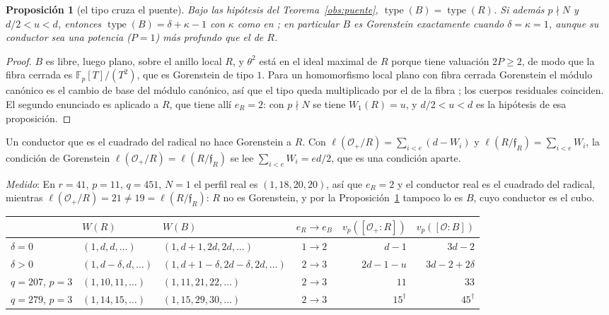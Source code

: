\documentclass[11pt,a4paper]{article}
\newtheorem{proposition}[theorem]{Proposici\'on}
\theoremstyle{definition}
\newcommand{\FF}{\mathbb{F}}
\newcommand{\cO}{\mathcal{O}}
\newcommand{\medido}[1]{\emph{Medido}: #1}
\begin{document}
\begin{proposition}[el tipo cruza el puente]\label{prop:tipopuente}
Bajo las hip\'otesis del Teorema~\ref{obs:puente},
$\operatorname{type}(B)=\operatorname{type}(R)$. Si adem\'as $p\nmid N$ y $d/2<u<d$, entonces
$\operatorname{type}(B)=\delta+\kappa-1$ con $\kappa$ como en \cite[Prop.~11]{Cond}; en particular
$B$ es Gorenstein exactamente cuando $\delta=\kappa=1$, aunque su conductor sea una potencia ($P=1$) m\'as
profundo que el de $R$.
\end{proposition}

\begin{proof}
$B$ es libre, luego plano, sobre el anillo local $R$, y $\theta^2$ est\'a en el ideal maximal de
$R$ porque tiene valuaci\'on $2P\ge2$, de modo que la fibra cerrada es $\FF_p[T]/(T^2)$, que es
Gorenstein de tipo $1$. Para un homomorfismo local plano con fibra cerrada Gorenstein el m\'odulo
can\'onico es el cambio de base del m\'odulo can\'onico, as\'i que el tipo queda multiplicado por
el de la fibra \cite[\S3.3]{BH}; los cuerpos residuales coinciden. El segundo enunciado es
\cite[Prop.~11]{Cond} aplicado a $R$, que tiene all\'i $e_R=2$: con $p\nmid N$ se tiene
$W_1(R)=u$, y $d/2<u<d$ es la hip\'otesis de esa proposici\'on.
\end{proof}

Un conductor que es el cuadrado del radical no hace Gorenstein a $R$. Con
$\ell(\cO_+/R)=\sum_{i<e}(d-W_i)$ y $\ell(R/\mathfrak f_R)=\sum_{i<e}W_i$, la condici\'on de
Gorenstein $\ell(\cO_+/R)=\ell(R/\mathfrak f_R)$ se lee $\sum_{i<e}W_i=ed/2$, que es una
condici\'on aparte.

\medido{En $r=41$, $p=11$, $q=451$, $N=1$ el perfil real es $(1,18,20,20)$, as\'i que $e_R=2$ y el
conductor real es el cuadrado del radical, mientras $\ell(\cO_+/R)=21\neq19=\ell(R/\mathfrak f_R)$:
$R$ no es Gorenstein, y por la Proposici\'on~\ref{prop:tipopuente} tampoco lo es $B$, cuyo
conductor es el cubo.}

\medskip
\begin{center}\small
{}
\begin{tabular}{@{}lllcrr@{}}
\toprule
 & $W(R)$ & $W(B)$ & $e_R\to e_B$ & $v_p([\cO_+:R])$ & $v_p([\cO:B])$ \\
\midrule
$\delta=0$ & $(1,d,d,\dots)$ & $(1,d{+}1,2d,2d,\dots)$ & $1\to2$ & $d-1$ & $3d-2$ \\
$\delta>0$ & $(1,d{-}\delta,d,\dots)$ & $(1,d{+}1{-}\delta,2d{-}\delta,2d,\dots)$ & $2\to3$ &
  $2d-1-u$ & $3d-2+2\delta$ \\
\midrule
$q=207$, $p=3$ & $(1,10,11,\dots)$ & $(1,11,21,22,\dots)$ & $2\to3$ & $11$ & $33$ \\
$q=279$, $p=3$ & $(1,14,15,\dots)$ & $(1,15,29,30,\dots)$ & $2\to3$ & $15^\dagger$ & $45^\dagger$ \\
\bottomrule
\end{tabular}
\end{center}
\end{document}

